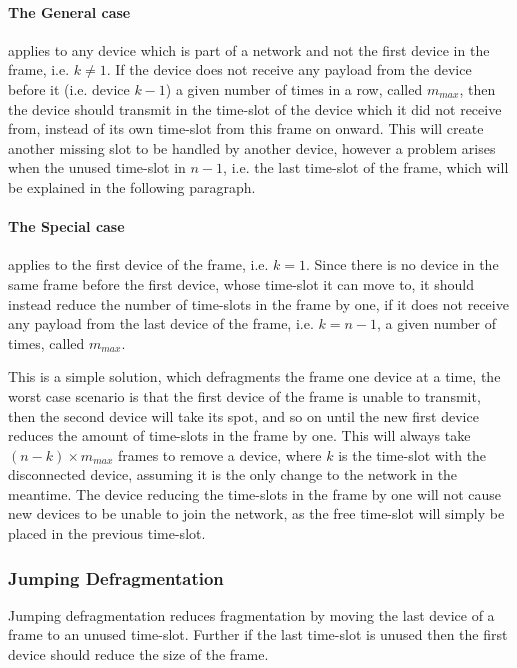 \paragraph{The General case}applies to any device which is part of a network and not the first device in the frame, i.e. $k \neq 1$.
If the device does not receive any payload from the device before it (i.e. device $k - 1$) a given number of times in a row, called $m_{max}$, then the device should transmit in the time-slot of the device which it did not receive from, instead of its own time-slot from this frame on onward. 
This will create another missing slot to be handled by another device, however a problem arises when the unused time-slot in $n - 1$, i.e. the last time-slot of the frame, which will be explained in the following paragraph.

\paragraph{The Special case}applies to the first device of the frame, i.e. $k = 1$. 
Since there is no device in the same frame before the first device, whose time-slot it can move to, it should instead reduce the number of time-slots in the frame by one, if it does not receive any payload from the last device of the frame, i.e. $k = n - 1$, a given number of times, called $m_{max}$. 


\bigskip

This is a simple solution, which defragments the frame one device at a time, the worst case scenario is that the first device of the frame is unable to transmit, then the second device will take its spot, and so on until the new first device reduces the amount of time-slots in the frame by one. 
This will always take $(n - k) \times m_{max}$ frames to remove a device, where $k$ is the time-slot with the disconnected device, assuming it is the only change to the network in the meantime. 
The device reducing the time-slots in the frame by one will not cause new devices to be unable to join the network, as the free time-slot will simply be placed in the previous time-slot. 

\subsubsection{Jumping Defragmentation}
Jumping defragmentation reduces fragmentation by moving the last device of a frame to an unused time-slot. Further if the last time-slot is unused then the first device should reduce the size of the frame.

